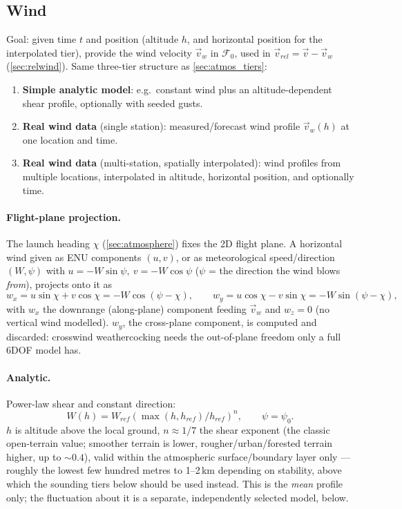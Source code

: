 \subsection{Wind}\label{sec:wind}
Goal: given time $t$ and position (altitude $h$, and horizontal position for the interpolated
tier), provide the wind velocity $\vec{v}_w$ in $\mathcal{F}_0$, used in
$\vec{v}_{rel} = \vec{v} - \vec{v}_w$ (\autoref{sec:relwind}). Same three-tier structure as
\autoref{sec:atmos_tiers}:
\begin{enumerate}
    \item \textbf{Simple analytic model}: e.g.\ constant wind plus an altitude-dependent shear
    profile, optionally with seeded gusts.
    \item \textbf{Real wind data} (single station): measured/forecast wind profile $\vec{v}_w(h)$
    at one location and time.
    \item \textbf{Real wind data} (multi-station, spatially interpolated): wind profiles from
    multiple locations, interpolated in altitude, horizontal position, and optionally time.
\end{enumerate}

\paragraph{Flight-plane projection.} The launch heading $\chi$ (\autoref{sec:atmosphere}) fixes the
2D flight plane. A horizontal wind given as ENU components $(u,v)$, or as meteorological
speed/direction $(W,\psi)$ with $u=-W\sin\psi,\ v=-W\cos\psi$ ($\psi$ = the direction the wind
blows \emph{from}), projects onto it as
\begin{equation}
    w_x = u\sin\chi + v\cos\chi = -W\cos(\psi-\chi), \qquad
    w_y = u\cos\chi - v\sin\chi = -W\sin(\psi-\chi),
\end{equation}
with $w_x$ the downrange (along-plane) component feeding $\vec{v}_w$ and $w_z=0$ (no vertical wind
modelled). $w_y$, the cross-plane component, is computed and discarded: crosswind weathercocking
needs the out-of-plane freedom only a full 6DOF model has.

\paragraph{Analytic.} Power-law shear and constant direction:
\begin{equation} \label{eq:wind_shear}
    W(h) = W_{ref}\left(\max(h,h_{ref})/h_{ref}\right)^{n}, \qquad \psi = \psi_0.
\end{equation}
$h$ is altitude above the local ground, $n\approx1/7$ the shear exponent (the classic open-terrain
value; smoother terrain is lower, rougher/urban/forested terrain higher, up to $\sim0.4$), valid
within the atmospheric surface/boundary layer only --- roughly the lowest few hundred metres to
1--2\,km depending on stability, above which the sounding tiers below should be used instead. This
is the \emph{mean} profile only; the fluctuation about it is a separate, independently selected
model, below.

